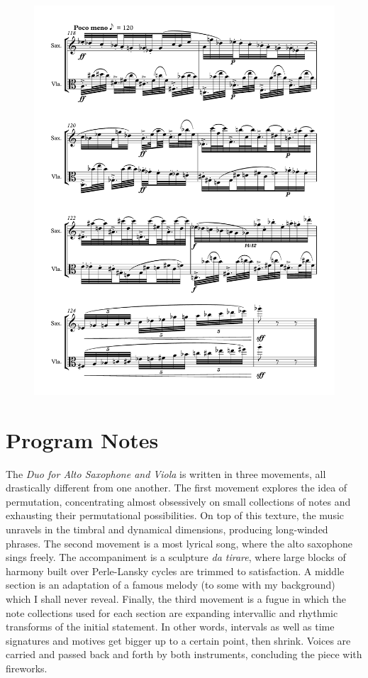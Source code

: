 \begin{figure}[htbp]
    \centering
	\includegraphics[width=6.5in]{figures/Sax_Viola_32.pdf}
\end{figure}

\section*{Program Notes}

The \emph{Duo for Alto Saxophone and Viola} is written in three movements, all drastically different from one another. The first movement explores the idea of permutation, concentrating almost obsessively on small collections of notes and exhausting their permutational possibilities. On top of this texture, the music unravels in the timbral and dynamical dimensions, producing long-winded phrases. The second movement is a most lyrical song, where the alto saxophone sings freely. The accompaniment is a sculpture \emph{da tirare}, where large blocks of harmony built over Perle-Lansky cycles are trimmed to satisfaction. A middle section is an adaptation of a famous melody (to some with my background) which I shall never reveal. Finally, the third movement is a fugue in which the note collections used for each section are expanding intervallic and rhythmic transforms of the initial statement. In other words, intervals as well as time signatures and motives get bigger up to a certain point, then shrink. Voices are carried and passed back and forth by both instruments, concluding the piece with fireworks.

